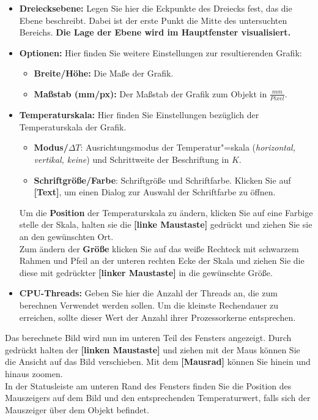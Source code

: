 \documentclass[10pt,a5paper,twoside,titlepage]{scrartcl}
\begin{document}
	\begin{itemize}
	\item \textbf{Dreiecksebene:} Legen Sie hier die Eckpunkte des Dreiecks fest, das die Ebene beschreibt. Dabei ist der erste Punkt die Mitte des untersuchten Bereichs. \textbf{Die Lage der Ebene wird im Hauptfenster visualisiert.}
	\item \textbf{Optionen:} Hier finden Sie weitere Einstellungen zur resultierenden Grafik:
	\begin{itemize}
	\item \textbf{Breite/Höhe:} Die Maße der Grafik.
	\item \textbf{Maßstab (mm/px):} Der Maßstab der Grafik zum Objekt in $\frac{mm}{Pixel}$. 
	\end{itemize}
	\item \textbf{Temperaturskala:} 
	Hier finden Sie Einstellungen bezüglich der Temperaturskala der Grafik. 
	\begin{itemize}
	\item \textbf{Modus/$\Delta T$}: Ausrichtungsmodus der Temperatur"=skala (\emph{horizontal, vertikal, keine}) und Schrittweite der Beschriftung in $K$.
	\item \textbf{Schriftgröße/Farbe}: Schriftgröße und Schriftfarbe.  Klicken Sie auf \textbf{[Text]}, um einen Dialog zur Auswahl der Schriftfarbe zu öffnen.
	\end{itemize}
	Um die \textbf{Position} der Temperaturskala zu ändern, klicken Sie auf eine Farbige stelle der Skala, halten sie die \textbf{[linke Maustaste]} gedrückt und ziehen Sie sie an den gewünschten Ort.\\
	Zum ändern der \textbf{Größe} klicken Sie auf das weiße Rechteck mit schwarzem Rahmen und Pfeil an der unteren rechten Ecke der Skala und ziehen Sie die diese mit gedrückter \textbf{[linker Maustaste]} in die gewünschte Größe.
	\item \textbf{CPU-Threads:} Geben Sie hier die Anzahl der Threads an, die zum berechnen Verwendet werden sollen. Um die kleinste Rechendauer zu erreichen, sollte dieser Wert der Anzahl ihrer Prozessorkerne entsprechen.
	\end{itemize}
	Das berechnete Bild wird nun im unteren Teil des Fensters angezeigt. Durch gedrückt halten der \textbf{[linken Maustaste]} und ziehen mit der Maus können Sie die Ansicht auf das Bild verschieben. Mit dem \textbf{[Mausrad]} können Sie hinein und hinaus zoomen.\\
	In der Statusleiste am unteren Rand des Fensters finden Sie die Position des Mauszeigers auf dem Bild und den entsprechenden Temperaturwert, falls sich der Mauszeiger über dem Objekt befindet.
\end{document}
